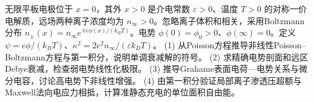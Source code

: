 无限平板电极位于 \(x=0\)，其外 \(x>0\) 是介电常数 \(\varepsilon>0\)、温度 \(T>0\) 的对称一价电解质，远场两种离子浓度均为 \(n_\infty>0\)。忽略离子体积和相关，采用Boltzmann分布 \(n_\pm(x)=n_\infty e^{\mp e\phi(x)/(k_BT)}\)。电势 \(\phi(0)=\phi_0>0\)、\(\phi(\infty)=0\)。定义 \(\psi=e\phi/(k_BT)\)、\(\kappa^2=2e^2n_\infty/(\varepsilon k_BT)\)。
(1) 从Poisson方程推导非线性Poisson–Boltzmann方程与第一积分，说明单调衰减解的符号。
(2) 求精确电势剖面和远区Debye衰减，检查弱电势线性化极限。
(3) 推导Grahame表面电荷—电势关系与微分电容，讨论高电势下非线性增强。
(4) 由第一积分验证局部离子渗透压超额与Maxwell法向电应力相抵，计算准静态充电的单位面积自由能。
